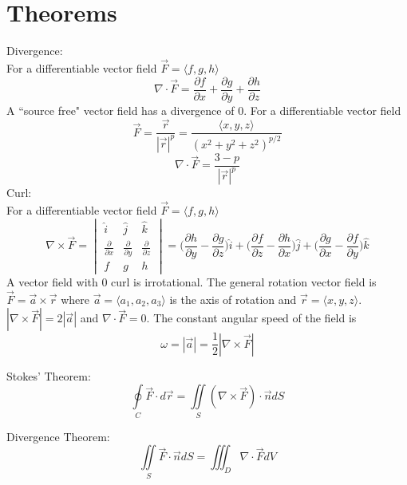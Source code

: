 \documentclass{article}
\begin{document}
\section{Theorems}
Divergence:
\\For a differentiable vector field $\vec F = \langle f,g,h \rangle$
$$\nabla \cdot \vec F = \frac{\partial f}{\partial x} + \frac{\partial g}{\partial y} + \frac{\partial h}{\partial z}$$
A ``source free" vector field has a divergence of 0. For a differentiable vector field
$$\vec F = \frac{\vec r}{| \vec r| ^p} = \frac{\langle x,y,z \rangle}{(x^2 + y^2 + z^2)^{p/2}}$$
$$ \nabla \cdot \vec F = \frac{3-p}{|\vec r |^p}$$
Curl:
\\For a differentiable vector field $\vec F = \langle f,g,h \rangle$
$$\nabla \times \vec F = \begin{vmatrix}
    \hat{i} & \hat{j} & \hat{k} \\
    \frac{\partial}{\partial x} & \frac{\partial}{\partial y} & \frac{\partial}{\partial z} \\
    f & g & h
\end{vmatrix} = \bigg(\frac{\partial h}{\partial y} - \frac{\partial g}{\partial z} \bigg) \hat{i} + \bigg(\frac{\partial f}{\partial z} - \frac{\partial h}{\partial x} \bigg) \hat{j} + \bigg(\frac{\partial g}{\partial x} - \frac{\partial f}{\partial y} \bigg)\hat{k}$$
A vector field with 0 curl is irrotational. The general rotation vector field is $\vec F = \vec a \times \vec r$ where $\vec a = \langle a_1, a_2, a_3 \rangle$ is the axis of rotation and $\vec r = \langle x,y,z \rangle$. $|\nabla \times \vec F| = 2 |\vec a|$ and $\nabla \cdot \vec F = 0$. The constant angular speed of the field is 
$$\omega = |\vec a| = \frac{1}{2} | \nabla \times \vec F|$$

Stokes' Theorem:
$$\oint \limits _C \vec F \cdot d\vec r = \iint \limits _S (\nabla \times \vec F) \cdot \vec n dS$$

Divergence Theorem:
$$\iint \limits_S \vec F \cdot \vec n dS = \iiint _D \nabla \cdot \vec F dV$$
\end{document}
